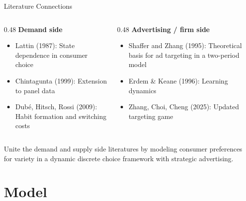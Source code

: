 \documentclass[aspectratio=169,professionalfonts]{beamer}
\newcommand{\hl}[1]{\textbf{\textcolor{UGARed}{#1}}}
\begin{document}
\begin{frame}{Literature Connections}
  \begin{columns}[T]
    \begin{column}{0.48\textwidth}
      \hl{Demand side}
      \begin{itemize}
        \item Lattin (1987): State dependence in consumer choice
        \item Chintagunta (1999): Extension to panel data
        \item Dub\'e, Hitsch, Rossi (2009): Habit formation and switching costs
      \end{itemize}
    \end{column}
    \begin{column}{0.48\textwidth}
      \hl{Advertising / firm side}
      \begin{itemize}
        \item Shaffer and Zhang (1995): Theoretical basis for ad targeting in a two-period model
        \item Erdem \& Keane (1996): Learning dynamics
        \item Zhang, Choi, Cheng (2025): Updated targeting game
      \end{itemize}
    \end{column}
  \end{columns}

  \vspace{1pt}
  \begin{tcolorbox}[colback=red!5!white, colframe=UGARed, title=\textbf{Contribution}]
    Unite the demand and supply side literatures by modeling consumer preferences for variety in a dynamic discrete choice framework with strategic advertising.
  \end{tcolorbox}
\end{frame}

\section{Model}
\end{document}
